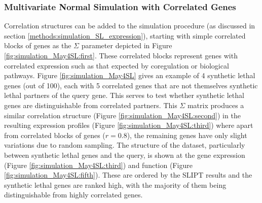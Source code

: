 \FloatBarrier

\subsubsection{Multivariate Normal Simulation with Correlated Genes} \label{chapt2:simulation_mvtnorm_cor}

Correlation structures can be added to the simulation procedure (as discussed in section \ref{methods:simulation_SL_expression}), starting with simple correlated blocks of genes as the $\Sigma$ parameter depicted in Figure \ref{fig:simulation_May4SL:first}. These correlated blocks represent genes with correlated expression such as that expected by coregulation or biological pathways. Figure \ref{fig:simulation_May4SL} gives an example of 4 synthetic lethal genes (out of 100), each with 5 correlated genes that are not themselves synthetic lethal partners of the query gene. This serves to test whether synthetic lethal genes are distinguishable from correlated partners. This $\Sigma$ matrix produces a similar correlation structure (Figure \ref{fig:simulation_May4SL:second}) in the resulting expression profiles (Figure \ref{fig:simulation_May4SL:third}) where apart from correlated blocks of genes ($r = 0.8$), the remaining genes have only slight variations due to random sampling. The structure of the dataset, particularly between synthetic lethal genes and the query, is shown at the gene expression (Figure \ref{fig:simulation_May4SL:third}) and function (Figure \ref{fig:simulation_May4SL:fifth}). These are ordered by the SLIPT results and the synthetic lethal genes are ranked high, with the majority of them being distinguishable from highly correlated genes.

